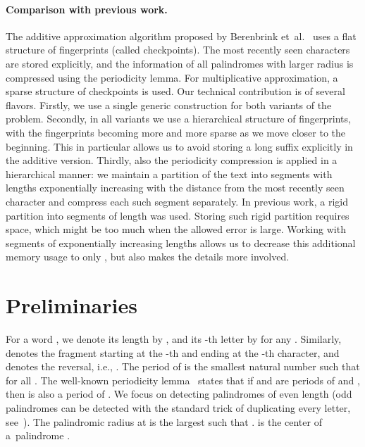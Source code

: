 \documentclass{article}[11pt,letter]
\newcommand{\ie}{i.e.\xspace}
\newcommand{\etal}{et~al.}
\begin{document}
\paragraph{Comparison with previous work.}
The additive approximation algorithm proposed by Berenbrink \etal~\cite{Berenbrink} uses a flat structure of  fingerprints (called checkpoints).  The most recently seen  characters are stored explicitly,
and the information of all palindromes with larger radius is compressed using the periodicity lemma.
For multiplicative approximation, a sparse structure of checkpoints is used.
Our technical contribution is of several flavors. Firstly, we use a single generic construction 
for both variants of the problem. Secondly, in all variants we use a hierarchical structure of fingerprints,
with the fingerprints becoming more and more sparse as we move closer to the beginning.
This in particular allows us to avoid storing a long suffix explicitly in the
additive version. Thirdly, also the periodicity compression is applied in a hierarchical manner:
we maintain a partition of the text into segments with lengths exponentially increasing
with the distance from the most recently seen character and compress each such segment
separately. In previous work, a rigid partition into segments of length  was used.
Storing such rigid partition requires  space, which might be too much
when the allowed error is large. Working with segments of exponentially increasing lengths
allows us to decrease this additional memory usage to only , but
also makes the details more involved.




\section{Preliminaries}
\label{section:preliminaries}

For a word , we denote its length by , and its -th letter by  for any . Similarly,  denotes the fragment starting at the -th
and ending at the -th character, and  denotes the reversal, \ie, . The period  of  is the smallest natural number such that
 for all .
The well-known periodicity lemma~\cite{FineWilf} states that if  and  are periods of  and , then  is also a period
of .
We focus on detecting palindromes of even length (odd palindromes can be detected with the standard trick of duplicating every letter, see~\cite{Apostolico}).
The palindromic radius at  is the largest  such that .  is the center of
a~palindrome .
\end{document}
